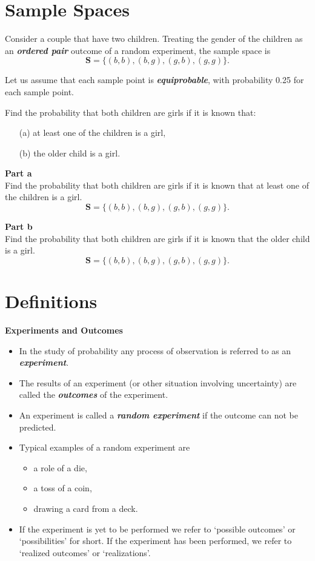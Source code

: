 \documentclass[]{report}
\begin{document}
{\section{Sample Spaces}
Consider a couple that have two children. Treating the gender of the children as an \textit{\textbf{ordered pair}} outcome of a random experiment, the sample space is 
\[\boldsymbol{S} = \{ (b,b), (b,g), (g,b), (g,g)\}.\]

Let us assume that each sample point is \textit{\textbf{equiprobable}}, with probability 0.25 for each sample point.



Find the probability that both children are girls if it is known that: 

\begin{itemize}
\item[(a)] at least one of the children is a girl,
\item[(b)] the older child is a girl. 
\end{itemize}




\textbf{Part a} \\
Find the probability that both children are girls if it is known that at least one of the children is a girl.
\[\boldsymbol{S} = \{ (b,b), (b,g), (g,b), (g,g)\}.\]




\textbf{Part b} \\
Find the probability that both children are girls if it is known that the older child is a girl.
\[\boldsymbol{S} = \{ (b,b), (b,g), (g,b), (g,g)\}.\]


\section{Definitions}

\textbf{Experiments and Outcomes}
\begin{itemize}
\item  In the study of probability any process of observation is referred to as an \textbf{\emph{experiment}}.
\item  The results of an experiment (or other situation involving uncertainty) are called the \textbf{\emph{outcomes }}of the experiment.
\item  An experiment is called a \textbf{\emph{random experiment}} if the outcome can not be predicted.
\item  Typical examples of a random experiment are \begin{itemize} \item  a role of a die, \item  a toss of a coin, \item  drawing a card from a deck.
\end{itemize}
\item  If the experiment is yet to be performed we refer to `possible outcomes' or `possibilities' for short. If the experiment has been performed, we refer to `realized outcomes' or `realizations'.
\end{itemize}




}
\end{document}
